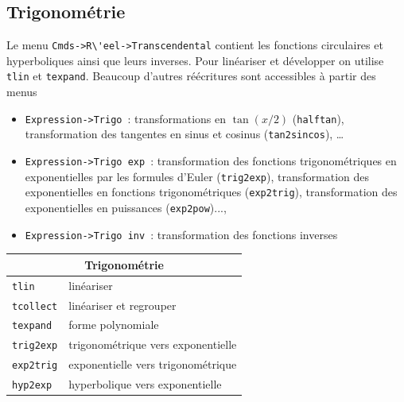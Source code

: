 \documentclass{article}
\begin{document}
\begin{giacjshere}
\subsection{Trigonom\'etrie}
%
Le menu \verb|Cmds->R\'eel->Transcendental| contient 
les fonctions circulaires et hyperboliques ainsi que leurs inverses. 
Pour lin\'eariser et
d\'evelopper on utilise \verb|tlin| et \verb|texpand|. Beaucoup
d'autres r\'e\'ecritures sont accessibles \`a partir des menus
\begin{itemize}
\item 
\verb|Expression->Trigo|~: transformations en $\tan(x/2)$ ({\tt halftan}), transformation des tangentes en sinus et
cosinus ({\tt tan2sincos}), \ldots
\item 
\verb|Expression->Trigo exp|~: transformation des fonctions 
trigonom\'etriques en exponentielles par les
formules d'Euler ({\tt trig2exp}), transformation des exponentielles en fonctions trigonom\'etriques ({\tt exp2trig}), transformation des exponentielles en puissances ({\tt exp2pow})...,
\item 
\verb|Expression->Trigo inv|~: transformation des fonctions inverses
\end{itemize}

\begin{center}
\begin{tabular}{|ll|}
\hline
\multicolumn{2}{|c|}{\bf Trigonom\'etrie}\\
\hline\hline
\verb|tlin| &lin\'eariser\\
\verb|tcollect| & lin\'eariser et regrouper\\
\verb|texpand| &forme polynomiale\\
\verb|trig2exp| &trigonom\'etrique vers exponentielle\\
\verb|exp2trig| &exponentielle vers trigonom\'etrique\\
\verb|hyp2exp| &hyperbolique vers exponentielle\\
\hline
\end{tabular}
\end{center}
%

\end{giacjshere}
\end{document}
